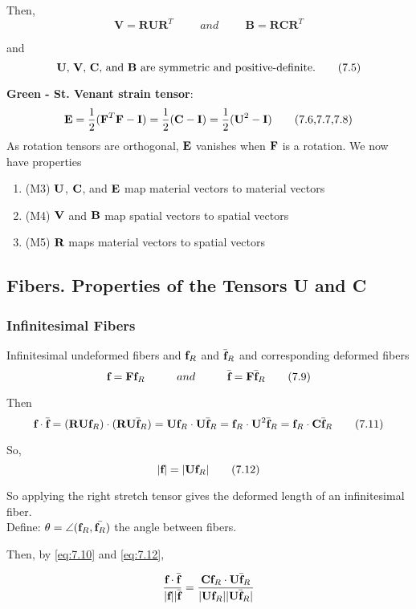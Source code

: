 \documentclass{article}
\begin{document}
Then,
\[
\textbf{V} = \textbf{RUR}^T \hspace{1cm} and \hspace{1cm} \textbf{B} = \textbf{RCR}^T \tag{7.4} \label{eq:7.4}
\]

and
\[
\text{\textbf{U}, \textbf{V}, \textbf{C}, and \textbf{B}\space are symmetric and positive-definite.}\tag{7.5}\label{eq:7.5}
\]

\textbf{Green - St. Venant strain tensor}:
\[
\textbf{E} 	= \frac{1}{2}(\textbf{F}^T\textbf{F} - \textbf{I})
	= \frac{1}{2}(\textbf{C} - \textbf{I})
	= \frac{1}{2}(\textbf{U}^2 - \textbf{I})\tag{7.6,7.7,7.8}
\]
As rotation tensors are orthogonal, $\textbf{E}$ vanishes when $\textbf{F}$ is a rotation.
We now have properties
\begin{enumerate}
	\item (M3) $\textbf{U}$, $\textbf{C}$, and $\textbf{E}$ map material vectors to material vectors
	\item (M4) $\textbf{V}$ and $\textbf{B}$ map spatial vectors to spatial vectors
	\item (M5) $\textbf{R}$ maps material vectors to spatial vectors
\end{enumerate}

\subsection{Fibers. Properties of the Tensors U and C}
\subsubsection{Infinitesimal Fibers}
Infinitesimal undeformed fibers and $\textbf{f}_R$ and $\bar{\textbf{f}}_R$ and corresponding deformed fibers
\[
	\textbf{f} = \textbf{F}\textbf{f}_R \hspace{1cm} and \hspace{1cm} \bar{\textbf{f}} = \textbf{F}\bar{\textbf{f}}_R\tag{7.9}\label{eq:7.9}
\]

Then
\[
	\textbf{f}\cdot\bar{\textbf{f}} = (\textbf{R}\textbf{U}\textbf{f}_R)\cdot(\textbf{R}\textbf{U}\bar{\textbf{f}}_R) = \textbf{U}\textbf{f}_R\cdot\textbf{U}\bar{\textbf{f}}_R = \textbf{f}_R\cdot\textbf{U}^2\bar{\textbf{f}}_R
	 = \textbf{f}_R\cdot\textbf{C}\bar{\textbf{f}}_R\tag{7.11}\label{eq:7.11}
\]

So,
\[
	|\textbf{f}| = |\textbf{U}\textbf{f}_R|\tag{7.12}\label{eq:7.12}
\]

So applying the right stretch tensor gives the deformed length of an infinitesimal fiber.\\

Define: $\theta = \angle(\textbf{f}_R,\bar{\textbf{f}_R})$ the angle between fibers.

Then,
by \ref{eq:7.10} and \ref{eq:7.12},

\[
	\frac{\textbf{f}\cdot\bar{\textbf{f}}}{|\textbf{f}||\bar{\textbf{f}}} = \frac{\textbf{C}\textbf{f}_R\cdot\textbf{U}\bar{\textbf{f}}_R}{|\textbf{U}\textbf{f}_R||\textbf{U}\bar{\textbf{f}}_R|}
\]
\end{document}
